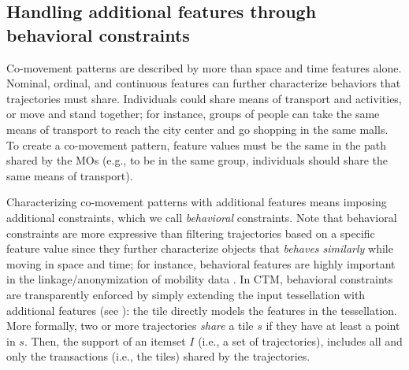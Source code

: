 \documentclass[
]{ceurart}
\newcommand{\mf}[1]{#1}
\newcommand{\mfc}[2]{\mf{#1} {\color{red}{\textit{#2}}}}
\begin{document}
\subsection{Handling additional features through behavioral constraints}
\label{sec:constr}
Co-movement patterns are described by more than space and time features alone.
Nominal, ordinal, and continuous features can further characterize behaviors that trajectories must share.
Individuals could share means of transport and activities, or move and stand together; for instance, groups of people can take the same means of transport to reach the city center and go shopping in the same malls.
To create a co-movement pattern, feature values must be the same in the path shared by the MOs (e.g., to be in the same group, individuals should share the same means of transport).

Characterizing co-movement patterns with additional features means imposing additional constraints, which we call \textit{behavioral} constraints. 
Note that behavioral constraints are more expressive than filtering trajectories based on a specific feature value since they further characterize objects that \textit{behaves similarly} while moving in space and time; for instance, behavioral features are highly important in the linkage/anonymization of mobility data \citep{DBLP:journals/tkde/JinHFCOZ23}.
In CTM, behavioral constraints are transparently enforced by simply extending the input tessellation with additional features (see ): the tile directly models the features in the tessellation.
More formally, two or more trajectories \textit{share} a tile $s$ if they have at least a point in $s$. Then, the support of an itemset $I$ (i.e., a set of trajectories), includes all and only the transactions (i.e., the tiles) shared by the trajectories.
\end{document}

